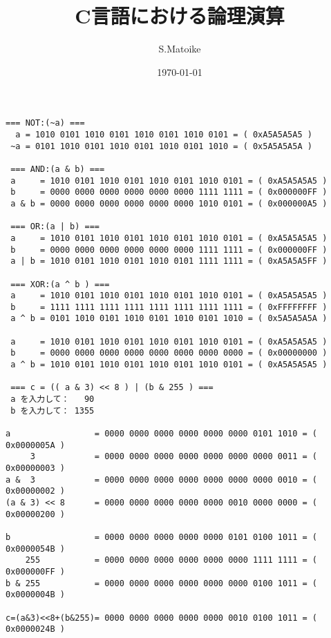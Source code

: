 \documentclass[uplatex, a4paper,11pt]{jsarticle}
\begin{document}
%

\title{C言語における論理演算}
\author{S.Matoike}
\date{\today}
\maketitle

\thispagestyle{empty}
\clearpage
\addtocounter{page}{-1}
\setcounter{tocdepth}{1}
\newpage

\lstset{escapechar=@,style=customc}


\newpage

\lstset{escapechar=@,style=custombash}
\begin{lstlisting}[caption=プログラムの実行結果,label=CLogicalExecuted]
 === NOT:(~a) ===
  a = 1010 0101 1010 0101 1010 0101 1010 0101 = ( 0xA5A5A5A5 )
 ~a = 0101 1010 0101 1010 0101 1010 0101 1010 = ( 0x5A5A5A5A )
 
 === AND:(a & b) ===
 a     = 1010 0101 1010 0101 1010 0101 1010 0101 = ( 0xA5A5A5A5 )
 b     = 0000 0000 0000 0000 0000 0000 1111 1111 = ( 0x000000FF )
 a & b = 0000 0000 0000 0000 0000 0000 1010 0101 = ( 0x000000A5 )
 
 === OR:(a | b) ===
 a     = 1010 0101 1010 0101 1010 0101 1010 0101 = ( 0xA5A5A5A5 )
 b     = 0000 0000 0000 0000 0000 0000 1111 1111 = ( 0x000000FF )
 a | b = 1010 0101 1010 0101 1010 0101 1111 1111 = ( 0xA5A5A5FF )
 
 === XOR:(a ^ b ) ===
 a     = 1010 0101 1010 0101 1010 0101 1010 0101 = ( 0xA5A5A5A5 )
 b     = 1111 1111 1111 1111 1111 1111 1111 1111 = ( 0xFFFFFFFF )
 a ^ b = 0101 1010 0101 1010 0101 1010 0101 1010 = ( 0x5A5A5A5A )
 
 a     = 1010 0101 1010 0101 1010 0101 1010 0101 = ( 0xA5A5A5A5 )
 b     = 0000 0000 0000 0000 0000 0000 0000 0000 = ( 0x00000000 )
 a ^ b = 1010 0101 1010 0101 1010 0101 1010 0101 = ( 0xA5A5A5A5 )
 
 === c = (( a & 3) << 8 ) | (b & 255 ) ===
 a を入力して：   90
 b を入力して： 1355

a                 = 0000 0000 0000 0000 0000 0000 0101 1010 = ( 0x0000005A )
     3            = 0000 0000 0000 0000 0000 0000 0000 0011 = ( 0x00000003 )
a &  3            = 0000 0000 0000 0000 0000 0000 0000 0010 = ( 0x00000002 )
(a & 3) << 8      = 0000 0000 0000 0000 0000 0010 0000 0000 = ( 0x00000200 )

b                 = 0000 0000 0000 0000 0000 0101 0100 1011 = ( 0x0000054B )
    255           = 0000 0000 0000 0000 0000 0000 1111 1111 = ( 0x000000FF )
b & 255           = 0000 0000 0000 0000 0000 0000 0100 1011 = ( 0x0000004B )

c=(a&3)<<8+(b&255)= 0000 0000 0000 0000 0000 0010 0100 1011 = ( 0x0000024B )
\end{lstlisting}
\end{document}

